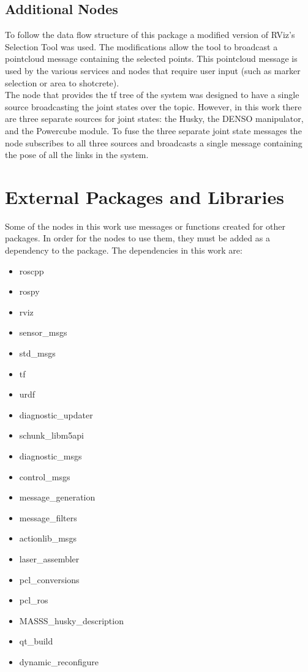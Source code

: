 \subsection{Additional Nodes}
To follow the data flow structure of this package a modified version of RViz's Selection Tool was used. The modifications allow the tool to broadcast a pointcloud message containing the selected points. This pointcloud message is used by the various services and nodes that require user input (such as marker selection or area to shotcrete).\\

The  node that provides the tf tree of the system was designed to have a single source broadcasting the joint states over the  topic. However, in this work there are three separate sources for joint states: the Husky, the DENSO manipulator, and the Powercube module. To fuse the three separate joint state messages the  node subscribes to all three sources and broadcasts a single message containing the pose of all the links in the system.\\
\section{External Packages and Libraries}
\label{sec:extpkg}
Some of the nodes in this work use messages or functions created for other packages. In order for the nodes to use them, they must be added as a dependency to the package. The dependencies in this work are:

\begin{itemize}
\item roscpp
\item rospy
\item rviz
\item sensor\_msgs
\item std\_msgs
\item tf
\item urdf 
\item diagnostic\_updater
\item schunk\_libm5api
\item diagnostic\_msgs
\item control\_msgs
\item message\_generation
\item message\_filters
\item actionlib\_msgs
\item laser\_assembler
\item pcl\_conversions 
\item pcl\_ros 
\item MASSS\_husky\_description
\item qt\_build
\item dynamic\_reconfigure
\end{itemize}